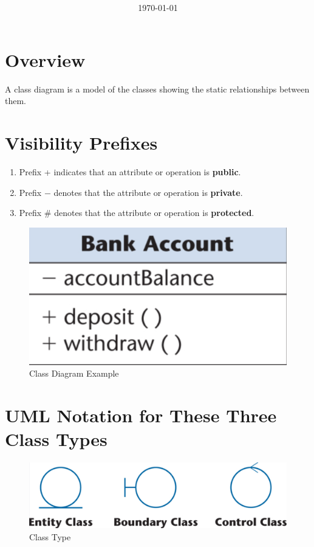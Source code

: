 \documentclass[11pt]{article}
\title{\textbf{\Topic}}
\author{\Name}
\date{\today}
\begin{document}
\maketitle
\noindent\makebox[\linewidth]{\rule[8pt]{5in}{0.5pt}}

\section*{Overview}

A class diagram is a model of the classes showing the static relationships between them.

\section*{Visibility Prefixes}

\begin{enumerate}
	\item Prefix + indicates that an attribute or operation is \textbf{public}.
	\item Prefix $-$ denotes that the attribute or operation is \textbf{private}.
	\item Prefix \# denotes that the attribute or operation is \textbf{protected}.
\end{enumerate}

\begin{figure}[h]
	\centering
	\includegraphics[width=0.3\linewidth]{images/SingleClass.png}
	\caption{Class Diagram Example}
	\label{fig:SingleClass}
\end{figure}

\section*{UML Notation for These Three Class Types}

\begin{figure}[h]
	\centering
	\includegraphics[width=0.8\linewidth]{images/ClassType.png}
	\caption{Class Type}
	\label{fig:ClassType}
\end{figure}
\end{document}
